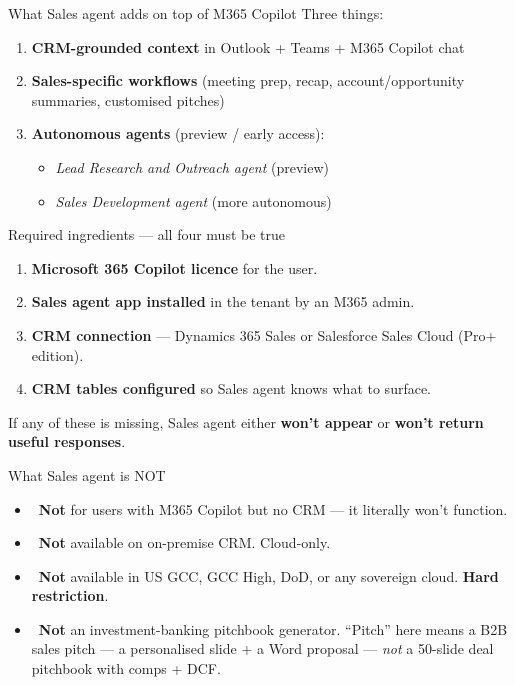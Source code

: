 \documentclass[11pt,aspectratio=169]{beamer}
\newcommand{\bad}{\textcolor{warningred}{\textbf{\texttimes}}}
\newcommand{\hl}[1]{\textbf{\textcolor{accentteal}{#1}}}
\begin{document}
\begin{frame}{What Sales agent adds on top of M365 Copilot}
  Three things:
  \medskip
  \begin{enumerate}
    \item \textbf{CRM-grounded context} in Outlook + Teams + M365 Copilot chat
    \item \textbf{Sales-specific workflows} (meeting prep, recap, account/opportunity summaries, customised pitches)
    \item \textbf{Autonomous agents} (preview / early access):
      \begin{itemize}
        \item \textit{Lead Research and Outreach agent} (preview)
        \item \textit{Sales Development agent} (more autonomous)
      \end{itemize}
  \end{enumerate}
\end{frame}

\begin{frame}{Required ingredients --- all four must be true}
  \begin{enumerate}
    \item \textbf{Microsoft 365 Copilot licence} for the user.
    \item \textbf{Sales agent app installed} in the tenant by an M365 admin.
    \item \textbf{CRM connection} --- Dynamics 365 Sales or Salesforce Sales Cloud (Pro+ edition).
    \item \textbf{CRM tables configured} so Sales agent knows what to surface.
  \end{enumerate}

  \vfill
  If any of these is missing, Sales agent either \hl{won't appear} or \hl{won't return useful responses}.
\end{frame}

\begin{frame}{What Sales agent is NOT}
  \begin{itemize}
    \item \bad\ \textbf{Not} for users with M365 Copilot but no CRM --- it literally won't function.
    \item \bad\ \textbf{Not} available on on-premise CRM. Cloud-only.
    \item \bad\ \textbf{Not} available in US GCC, GCC High, DoD, or any sovereign cloud. \hl{Hard restriction}.
    \item \bad\ \textbf{Not} an investment-banking pitchbook generator. ``Pitch'' here means a B2B sales pitch --- a personalised slide + a Word proposal --- \textit{not} a 50-slide deal pitchbook with comps + DCF.
  \end{itemize}
\end{frame}
\end{document}
